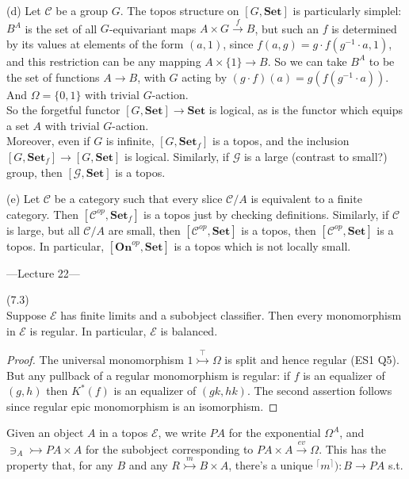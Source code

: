 \documentclass[a4paper]{article}
\begin{document}
\begin{eg}
    (d) Let $\mathcal{C}$ be a group $G$. The topos structure on $[G,\mathbf{Set}]$ is particularly simplel: $B^A$ is the set of all $G$-equivariant maps $A\times G \xrightarrow{f} B$, but such an $f$ is determined by its values at elements of the form $(a,1)$, since $f(a,g) = g \cdot f(g^{-1}\cdot a, 1)$, and this restriction can be any mapping $A \times \{1\} \to B$. So we can take $B^A$ to be the set of functions $A \to B$, with $G$ acting by $(g \cdot f) (a) = g(f(g^{-1} \cdot a))$. And $\Omega = \{0,1\}$ with trivial $G$-action.\\
    So the forgetful functor $[G,\mathbf{Set}] \to \mathbf{Set}$ is logical, as is the functor which equips a set $A$ with trivial $G$-action.\\
    Moreover, even if $G$ is infinite, $[G,\mathbf{Set}_f]$ is a topos, and the inclusion $[G,\mathbf{Set}_f] \to [G,\mathbf{Set}]$ is logical. Similarly, if $\mathcal{G}$ is a large (contrast to small?) group, then $[\mathcal{G},\mathbf{Set}]$ is a topos.

    (e) Let $\mathcal{C}$ be a category such that every slice $\mathcal{C}/A$ is equivalent to a finite category. Then $[\mathcal{C}^{op},\mathbf{Set}_f]$ is a topos just by checking definitions. Similarly, if $\mathcal{C}$ is large, but all $\mathcal{C}/A$ are small, then $[\mathcal{C}^{op},\mathbf{Set}]$ is a topos, then $[\mathcal{C}^{op},\mathbf{Set}]$ is a topos. In particular, $[\mathbf{On}^{op},\mathbf{Set}]$ is a topos which is not locally small.
\end{eg}

---Lecture 22---

\begin{lemma} (7.3)\\
    Suppose $\mathcal{E}$ has finite limits and a subobject classifier. Then every monomorphism in $\mathcal{E}$ is regular. In particular, $\mathcal{E}$ is balanced.
    \begin{proof}
        The universal monomorphism $1 \stackrel{\top}{\rightarrowtail} \Omega$ is split and hence regular (ES1 Q5). But any pullback of a regular monomorphism is regular: if $f$ is an equalizer of $(g,h)$ then $K^*(f)$ is an equalizer of $(gk,hk)$. The second assertion follows since regular epic monomorphism is an isomorphism.
    \end{proof}
\end{lemma}

Given an object $A$ in a topos $\mathcal{E}$, we write $PA$ for the exponential $\Omega^A$, and $\ni_A \rightarrowtail PA \times A$ for the subobject corresponding to $PA \times A \xrightarrow{ev} \Omega$. This has the property that, for any $B$ and any $R \stackrel{m}{\rightarrowtail} B \times A$, there's a unique ${}^{\lceil}m^\rceil): B \to PA$ s.t.
\end{document}
